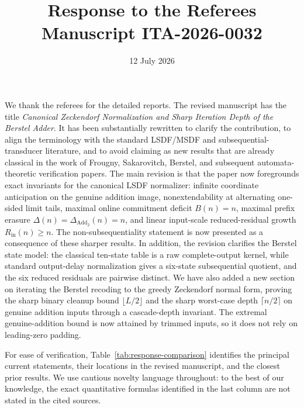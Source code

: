 \documentclass[11pt]{article}
\title{Response to the Referees\\
\large Manuscript ITA-2026-0032}
\author{}
\date{12 July 2026}
\begin{document}
\maketitle

\noindent
We thank the referees for the detailed reports.  The revised manuscript has
the title \emph{Canonical Zeckendorf Normalization and Sharp Iteration Depth
of the Berstel Adder}.  It has been substantially rewritten to clarify the contribution, to align the
terminology with the standard LSDF/MSDF and subsequential-transducer
literature, and to avoid claiming as new results that are already classical in
the work of Frougny, Sakarovitch, Berstel, and subsequent automata-theoretic
verification papers.  The main revision is that the paper now foregrounds
exact invariants for the canonical LSDF normalizer: infinite coordinate
anticipation on the genuine addition image, nonextendability at alternating
one-sided limit tails, maximal online commitment deficit $B(n)=n$, maximal
prefix erasure $\Delta(n)=\Delta_{\operatorname{Add}_2}(n)=n$, and linear
input-scale reduced-residual growth $R_{\mathrm{in}}(n)\ge n$.  The
non-subsequentiality statement is
now presented as a consequence of these sharper results.  In addition, the
revision clarifies the Berstel state model: the classical ten-state table is
a raw complete-output kernel, while standard output-delay normalization gives
a six-state subsequential quotient, and the six reduced residuals are
pairwise distinct.  We have also added a new section on iterating the
Berstel recoding to the greedy Zeckendorf normal form, proving the sharp
binary cleanup bound $\lfloor L/2\rfloor$ and the sharp worst-case depth
$\lceil n/2\rceil$ on genuine addition inputs through a cascade-depth
invariant.  The extremal genuine-addition bound is now attained by trimmed
inputs, so it does not rely on leading-zero padding.

For ease of verification, Table~\ref{tab:response-comparison} identifies the
principal current statements, their locations in the revised manuscript, and
the closest prior results.  We use cautious novelty language throughout: to
the best of our knowledge, the exact quantitative formulas identified in the
last column are not stated in the cited sources.
\end{document}
